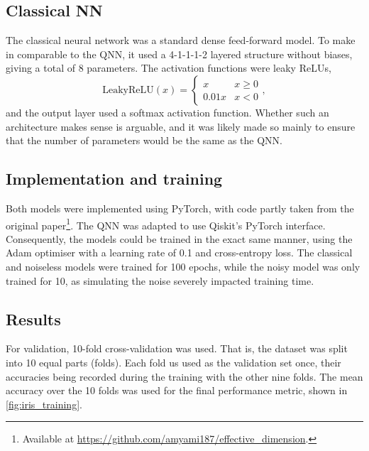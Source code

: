 \subsection{Classical NN}
The classical neural network was a standard dense feed-forward model.
To make in comparable to the QNN, it used a 4-1-1-1-2 layered structure without biases, giving a total of 8 parameters.
The activation functions were leaky ReLUs,
\begin{equation}
    \text{LeakyReLU}(x) = \begin{cases}
        x     & x \geq 0 \\
        0.01x & x < 0
    \end{cases},
\end{equation}
and the output layer used a softmax activation function.
Whether such an architecture makes sense is arguable, and it was likely made so mainly to ensure that the number of parameters would be the same as the QNN.


\subsection{Implementation and training}
Both models were implemented using PyTorch, with code partly taken from the original paper\footnote{Available at \url{https://github.com/amyami187/effective_dimension}.}.
The QNN was adapted to use Qiskit's PyTorch interface.
Consequently, the models could be trained in the exact same manner, using the Adam optimiser with a learning rate of 0.1 and cross-entropy loss.
The classical and noiseless models were trained for 100 epochs, while the noisy model was only trained for 10, as simulating the noise severely impacted training time.

\subsection{Results}
For validation, 10-fold cross-validation was used.
That is, the dataset was split into 10 equal parts (folds).
Each fold us used as the validation set once, their accuracies being recorded during the training with the other nine folds.
The mean accuracy over the 10 folds was used for the final performance metric, shown in \cref{fig:iris_training}.

